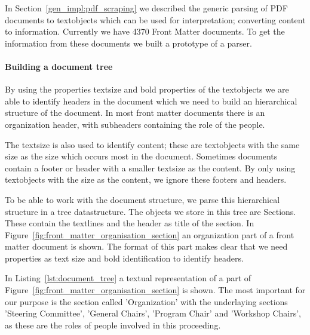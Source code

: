 \documentclass{ou-report}
\begin{document}
In Section~\ref{gen_impl:pdf_scraping} we described the generic parsing of PDF
documents to textobjects which can be used for interpretation; converting 
content to information. 
Currently we have 4370 Front Matter documents. To get the information from these 
documents we built a prototype of a parser.


\paragraph{Building a document tree}
\label{sec:lncs_parser_doc_tree}
By using the properties textsize and bold properties of the textobjects we are 
able to identify headers in the document which we need to build an hierarchical 
structure of the document. In 
most front matter documents there is an organization header, with subheaders containing 
the role of the people.

The textsize is also used to identify content; these 
are textobjects with the same size as the size which occurs most in the 
document. Sometimes documents contain a footer or header with a smaller textsize 
as the content. By only using textobjects with the size as the content, we ignore
these footers and headers.

To be able to work with the document structure, we parse this hierarchical
structure in a tree datastructure.
The objects we store in this tree are Sections. These contain the 
textlines and the header as title of the section. 
In Figure~\ref{fig:front_matter_organisation_section} an organization part of 
a front matter document is shown. The format of this part makes clear that we 
need properties as text size and bold identification to identify headers. 



In
Listing~\ref{lst:document_tree} a textual representation of a part of
Figure~\ref{fig:front_matter_organisation_section} is shown.
The most important for our purpose is the section called 'Organization' with
the underlaying sections 'Steering Committee', 'General Chairs', 'Program Chair'
and 'Workshop Chairs', as these are the roles of people involved in this
proceeding.
\end{document}
